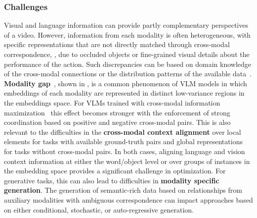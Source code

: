 \subsubsection{Challenges}

Visual and language information can provide partly complementary perspectives of a video. However, information from each modality is often heterogeneous, with specific representations that are not directly matched through cross-modal correspondence, \eg, due to occluded objects or fine-grained visual details about the performance of the action. Such discrepancies can be based on domain knowledge of the cross-modal connections or the distribution patterns of the available data~\citep{liang2024foundations}. \textbf{Modality gap}~\citep{liang2022mind}, shown in , is a common phenomenon of VLM models in which embeddings of each modality are represented in distinct low-variance regions in the embeddings space. For VLMs trained with cross-modal information maximization~\citep{bain2021frozen,lei2021less,li2020hero,li2022align,zhu2020actbert} this effect becomes stronger with the enforcement of strong coordination based on positive and negative cross-modal pairs. This is also relevant to the difficulties in the \textbf{cross-modal context alignment} over local elements for tasks with available ground-truth pairs and global representations for tasks without cross-modal pairs. In both cases, aligning language and vision context information at either the word/object level or over groups of instances in the embedding space provides a significant challenge in optimization. For generative tasks, this can also lead to difficulties in \textbf{modality specific generation}. The generation of semantic-rich data based on relationships from auxiliary modalities with ambiguous correspondence can impact approaches based on either conditional, stochastic, or auto-regressive generation.

